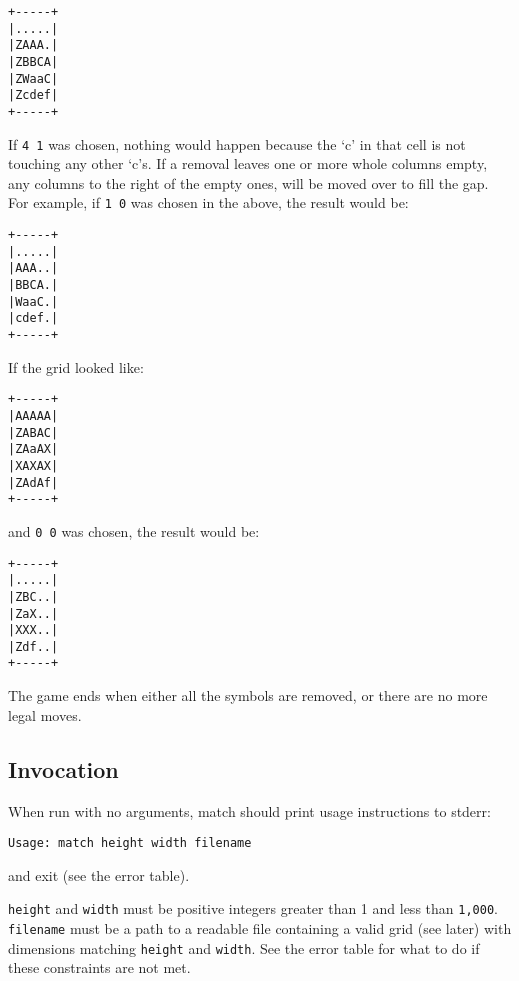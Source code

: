 \begin{center}
\begin{verbatim}
+-----+
|.....|
|ZAAA.|
|ZBBCA|
|ZWaaC|
|Zcdef|
+-----+
\end{verbatim}
\end{center}

If \texttt{4 1} was chosen, nothing would happen because the `c' in that cell is not touching any other `c's.
If a removal leaves one or more whole columns empty, any columns to the right of the empty ones, will be
moved over to fill the gap.
For example, if \texttt{1 0} was chosen in the above, the result would be:

\begin{center}
\begin{verbatim}
+-----+
|.....|
|AAA..|
|BBCA.|
|WaaC.|
|cdef.|
+-----+
\end{verbatim}
\end{center}

If the grid looked like:
\begin{center}
\begin{verbatim}
+-----+
|AAAAA|
|ZABAC|
|ZAaAX|
|XAXAX|
|ZAdAf|
+-----+
\end{verbatim}
\end{center}
and \texttt{0 0} was chosen, the result would be:
\begin{center}
\begin{verbatim}
+-----+
|.....|
|ZBC..|
|ZaX..|
|XXX..|
|Zdf..|
+-----+
\end{verbatim}
\end{center}

The game ends when either all the symbols are removed, or there are no more legal moves.


\subsection{Invocation}\label{sec:invoc}
\noindent
When run with no arguments, match should print usage instructions to stderr:\\
\begin{verbatim}
Usage: match height width filename
\end{verbatim}
and exit (see the error table).

\texttt{height} and \texttt{width} must be positive integers greater than 1 and less than \texttt{1,000}.
\texttt{filename} must be a path to a readable file containing a valid grid (see later) with dimensions matching \texttt{height}
and \texttt{width}.
See the error table for what to do if these constraints are not met.

